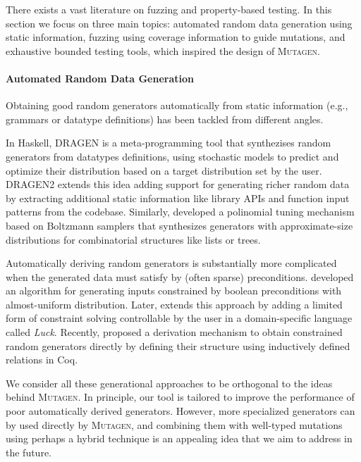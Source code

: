 \documentclass[acmsmall, anonymous]{acmart}
\newcommand{\mutagen}{\textsc{Mutagen}\xspace}
\begin{document}
There exists a vast literature on fuzzing and property-based testing.
%
In this section we focus on three main topics:
%
automated random data generation using static information,
%
fuzzing using coverage information to guide mutations, and
%
exhaustive bounded testing tools, which inspired the design of \mutagen.


\paragraph{Automated Random Data Generation}

Obtaining good random generators automatically from static information (e.g.,
grammars or datatype definitions) has been tackled from different angles.

In Haskell, DRAGEN \cite{dragen} is a meta-programming tool that synthezises
random generators from datatypes definitions, using stochastic models to predict
and optimize their distribution based on a target distribution set by the user.
%
DRAGEN2 \cite{dragen2} extends this idea adding support for generating richer
random data by extracting additional static information like library APIs and
function input patterns from the codebase.
%
Similarly, \cite{bendkowski} developed a polinomial tuning mechanism based on
Boltzmann samplers \cite{boltzmann} that synthesizes generators with
approximate-size distributions for combinatorial structures like lists or trees.
%

Automatically deriving random generators is substantially more complicated when
the generated data must satisfy by (often sparse) preconditions.
%
%
\cite{claessen2014} developed an algorithm for generating inputs constrained by
boolean preconditions with almost-uniform distribution.
%
%
Later, \cite{luck} extends this approach by adding a limited form of constraint
solving controllable by the user in a domain-specific language called
\emph{Luck}.
%
%
Recently, \cite{generatinggood} proposed a derivation mechanism to obtain
constrained random generators directly by defining their structure
using inductively defined relations in Coq.


We consider all these generational approaches to be orthogonal to the ideas
behind \mutagen.
%
In principle, our tool is tailored to improve the performance of poor
automatically derived generators.
%
However, more specialized generators can by used directly by \mutagen, and
combining them with well-typed mutations using perhaps a hybrid technique is an
appealing idea that we aim to address in the future.
\end{document}
